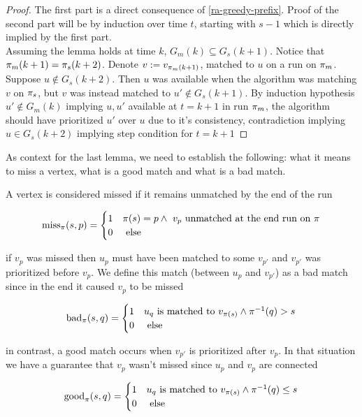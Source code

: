 \begin{proof}
	The first part is a direct consequence of \autoref{ra-greedy-prefix}. Proof of the second part will be by induction over time $t$, starting with $s-1$ which is directly implied by the first part.\\
	Assuming the lemma holds at time $k$, $G_m(k)\subseteq G_s(k+1)$. Notice that $\pi_m(k+1)=\pi_s(k+2)$. Denote $v:=v_{\pi_m(k+1)}$, matched to $u$ on a run on $\pi_m$. Suppose $u\not\in G_s(k+2)$. Then $u$ was available when the algorithm was matching $v$ on $\pi_s$, but $v$ was instead matched to $u'\not\in G_s(k+1)$. By induction hypothesis $u'\not\in G_m(k)$ implying $u,u'$ available at $t=k+1$ in run $\pi_m$, the algorithm should have prioritized $u'$ over $u$ due to it's consistency, contradiction implying $u\in G_s(k+2)$ implying step condition for $t=k+1$
\end{proof}

As context for the last lemma, we need to establish the following: what it means to miss a vertex, what is a good match and what is a bad match.

A vertex is considered missed if it remains unmatched by the end of the run

\[\mathrm{miss}_\pi(s,p)=\begin{cases}
	1 & \pi(s)=p\land\ v_p\text{ unmatched at the end run on }\pi\\
	0 & \text{ else}
\end{cases}\]

if $v_p$ was missed then $u_p$ must have been matched to some $v_{p'}$ and $v_{p'}$ was prioritized before $v_p$. We define this match (between $u_p$ and $v_{p'}$) as a bad match since in the end it caused $v_p$ to be missed

\[\mathrm{bad}_\pi(s,q)=\begin{cases}
	1 & u_q\text{ is matched to }v_{\pi(s)}\land \pi^{-1}(q)>s\\
	0 & \text{ else}
\end{cases}\]

in contrast, a good match occurs when $v_{p'}$ is prioritized after $v_p$. In that situation we have a guarantee that $v_p$ wasn't missed since $u_p$ and $v_p$ are connected

\[\mathrm{good}_\pi(s,q)=\begin{cases}
	1 & u_q\text{ is matched to }v_{\pi(s)}\land \pi^{-1}(q)\leq s\\
	0 & \text{ else}
\end{cases}\]

